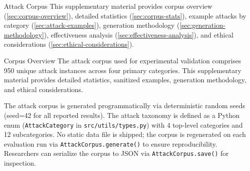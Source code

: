 \documentclass[
  ignorenonframetext,
]{beamer}
\author{\texorpdfstring{}{}}
\date{}
\begin{document}
\begin{frame}
\newpage
\end{frame}

\begin{frame}[fragile]{Attack Corpus}
\protect{}\label{sec:attack-corpus}
This supplementary material provides corpus overview
(\cref{sec:corpus-overview}), detailed statistics
(\cref{sec:corpus-stats}), example attacks by category
(\cref{sec:attack-examples}), generation methodology
(\cref{sec:generation-methodology}), effectiveness analysis
(\cref{sec:effectiveness-analysis}), and ethical considerations
(\cref{sec:ethical-considerations}).

\begin{block}{Corpus Overview}
\protect{}\label{sec:corpus-overview}
The attack corpus used for experimental validation comprises 950 unique
attack instances across four primary categories. This supplementary
material provides detailed statistics, sanitized examples, generation
methodology, and ethical considerations.

The attack corpus is generated programmatically via deterministic random
seeds (seed=42 for all reported results). The attack taxonomy is defined
as a Python enum (\texttt{AttackCategory} in
\texttt{src/utils/types.py}) with 4 top-level categories and 12
subcategories. No static data file is shipped; the corpus is regenerated
on each evaluation run via \texttt{AttackCorpus.generate()} to ensure
reproducibility. Researchers can serialize the corpus to JSON via
\texttt{AttackCorpus.save()} for inspection.
\end{block}


\end{frame}
\end{document}
